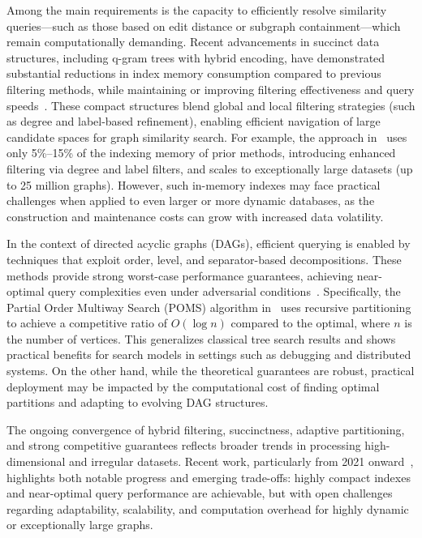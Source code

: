 \documentclass[sigconf]{acmart}
\begin{document}
Among the main requirements is the capacity to efficiently resolve similarity queries—such as those based on edit distance or subgraph containment—which remain computationally demanding. Recent advancements in succinct data structures, including q-gram trees with hybrid encoding, have demonstrated substantial reductions in index memory consumption compared to previous filtering methods, while maintaining or improving filtering effectiveness and query speeds~\cite{ref106}. These compact structures blend global and local filtering strategies (such as degree and label-based refinement), enabling efficient navigation of large candidate spaces for graph similarity search. For example, the approach in~\cite{ref106} uses only 5\%--15\% of the indexing memory of prior methods, introducing enhanced filtering via degree and label filters, and scales to exceptionally large datasets (up to 25 million graphs). However, such in-memory indexes may face practical challenges when applied to even larger or more dynamic databases, as the construction and maintenance costs can grow with increased data volatility.

In the context of directed acyclic graphs (DAGs), efficient querying is enabled by techniques that exploit order, level, and separator-based decompositions. These methods provide strong worst-case performance guarantees, achieving near-optimal query complexities even under adversarial conditions~\cite{ref107}. Specifically, the Partial Order Multiway Search (POMS) algorithm in~\cite{ref107} uses recursive partitioning to achieve a competitive ratio of $O(\log n)$ compared to the optimal, where $n$ is the number of vertices. This generalizes classical tree search results and shows practical benefits for search models in settings such as debugging and distributed systems. On the other hand, while the theoretical guarantees are robust, practical deployment may be impacted by the computational cost of finding optimal partitions and adapting to evolving DAG structures.

The ongoing convergence of hybrid filtering, succinctness, adaptive partitioning, and strong competitive guarantees reflects broader trends in processing high-dimensional and irregular datasets. Recent work, particularly from 2021 onward~\cite{ref106,ref107}, highlights both notable progress and emerging trade-offs: highly compact indexes and near-optimal query performance are achievable, but with open challenges regarding adaptability, scalability, and computation overhead for highly dynamic or exceptionally large graphs.
\end{document}
